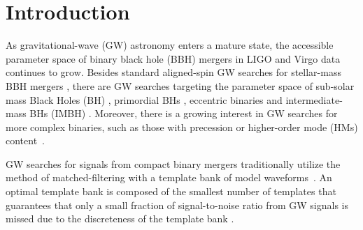 \documentclass[twocolumn,showpacs,preprintnumbers,nofootinbib,prd,
superscriptaddress,10pt]{revtex4-2}
\begin{document}
	\author{Sarah }
	\maketitle
\section{Introduction}

As gravitational-wave (GW) astronomy enters a mature state, the accessible parameter space of binary black hole (BBH) mergers in LIGO \cite{LIGOScientific:2014pky} and Virgo \cite{VIRGO:2014yos} data continues to grow. Besides standard aligned-spin GW searches for stellar-mass BBH mergers \cite{GWTC-1,GWTC-2,GWTC-2.1, GWTC-3}, there are GW searches targeting the parameter space of sub-solar mass Black Holes (BH) \cite{SSM_O2, SSM_O3a, PhysRevD.106.023024, Nitz:2021mzz}, primordial BHs \cite{PBH}, eccentric binaries \cite{PhysRevD.102.043005, PhysRevD.104.104016, Nitz:2019spj, LIGOScientific:2019dag, Ramos-Buades:2020eju, Wang:2021qsu, Nitz:2021mzz} and intermediate-mass BHs (IMBH) \cite{IMBH_O2, IMBH_O3, Chandra:2022ixv}. Moreover, there is a growing interest in GW searches for more complex binaries, such as those with precession \cite{PhysRevD.89.024010, Harry:2017weg, PhysRevD.102.041302, Indik:2016qky, Harry:2016ijz, Fairhurst:2019vut, McIsaac:2023ijd} or higher-order mode (HMs) content~\cite{CalderonBustillo:2015lrt, Harry:2017weg, Chandra_hom, 2021PhRvD.103b4042M}.

GW searches for signals from compact binary mergers traditionally utilize the method of matched-filtering with a template bank of model waveforms~\cite{Sathyaprakash:1991mt, Dhurandhar:1992mw, Owen:1998dk, Allen:2005fk, Babak:2006ty, Cokelaer:2007mv}.
An optimal template bank is composed of the smallest number of templates that guarantees that only a small fraction of signal-to-noise ratio from GW signals is missed due to the discreteness of the template bank \cite{Prix:2007ks}.
\end{document}
